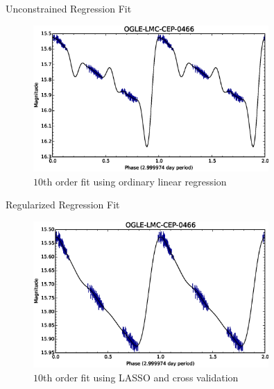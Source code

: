 \documentclass{beamer}
\begin{document}
\begin{frame}{Unconstrained Regression Fit}
  \begin{figure}[ht]
    \centering
    \includegraphics[width=0.8\textwidth]{img/lightcurve-ols}
    \caption{$10$th order fit using ordinary linear regression}
  \end{figure}
\end{frame}


\begin{frame}{Regularized Regression Fit}
  \begin{figure}[ht]
    \centering
    \includegraphics[width=0.8\textwidth]{img/lightcurve-lasso}
    \caption{$10$th order fit using LASSO and cross validation}
  \end{figure}
\end{frame}
\end{document}
